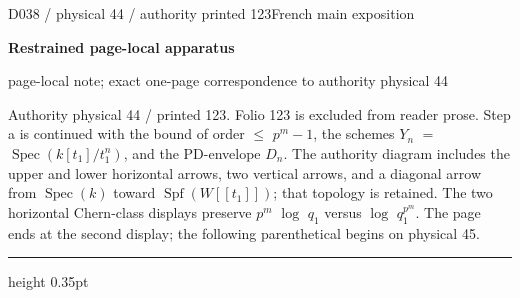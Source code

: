 \documentclass[9pt]{article}
\newcommand{\CanonText}[1]{\par{\fontsize{8.0}{9.35}\selectfont\RaggedRight #1\par}\vspace{2.2pt}}
\newcommand{\LayerTitle}{Restrained page-local apparatus}
\begin{document}
\noindent\begin{minipage}[t][\dimexpr\textheight-5pt\relax][t]{\textwidth}
{\sffamily\fontsize{7.3}{8.2}\selectfont\color{Quiet} D038 / physical 44 / authority printed 123\hfill French main exposition}
\par{}\vspace{4.5pt}
{\sffamily\fontsize{10.4}{11.6}\selectfont\bfseries\color{Accent} \LayerTitle}
\par{\sffamily\fontsize{6.7}{7.7}\selectfont\color{Quiet} page-local note; exact one-page correspondence to authority physical 44}
\vspace{5pt}
\CanonText{Authority physical 44 / printed 123. Folio 123 is excluded from reader prose. Step a is continued with the bound of order \(\leq{}\) \(p^{m}-1\), the schemes \(Y_{n}\) \(=\) \(\operatorname{Spec}(k[t_{1}]/t_{1}^{n})\), and the PD-envelope \(D_{n}\). The authority diagram includes the upper and lower horizontal arrows, two vertical arrows, and a diagonal arrow from \(\operatorname{Spec}(k)\) toward \(\operatorname{Spf}(W[[t_{1}]])\); that topology is retained. The two horizontal Chern-class displays preserve \(p^{m}\) \(\operatorname{log}\) \(q_{1}\) versus \(\operatorname{log}\) \(q_{1}^{p^{m}}\). The page ends at the second display; the following parenthetical begins on physical 45.}
\vfill
{\color{Accent}\hrule height 0.35pt}\vspace{3pt}
\end{minipage}
\newpage
\end{document}
